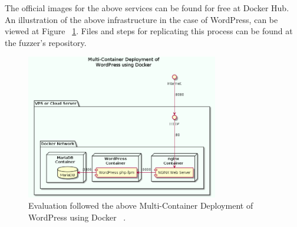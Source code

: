 The official images for the above services can be found for free at Docker Hub. An illustration of the above infrastructure in the case of WordPress, can be viewed at Figure ~\ref{fig:multi-container}. Files and steps for replicating this process can be found at the fuzzer's repository.

\begin{figure}[ht]
 \centering
 \captionsetup{justification=centering}
 \includegraphics[width=3.3in]{figures/multi-container.png}
 \caption{Evaluation followed the above Multi-Container Deployment of WordPress using Docker ~\cite{multi-container}.}
 \label{fig:multi-container}
\end{figure}
